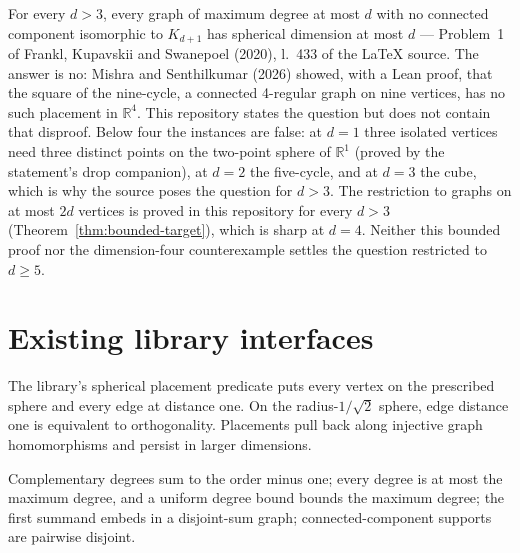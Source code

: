 \begin{conjecture}
  \label{que:fks}
  For every $d > 3$, every graph of maximum degree at most $d$ with no connected component
  isomorphic to $K_{d+1}$ has spherical dimension at most $d$ --- Problem~1 of
  Frankl, Kupavskii and Swanepoel (2020), l.~433 of the LaTeX source. The answer is no: Mishra and
  Senthilkumar (2026) showed, with a Lean proof, that the square of the nine-cycle, a
  connected 4-regular graph on nine vertices, has no such placement in $\mathbb{R}^4$. This
  repository states the question but does not contain that disproof. Below four the instances are false: at $d = 1$ three
  isolated vertices need three distinct points on the two-point sphere of $\mathbb{R}^1$
  (proved by the statement's drop companion), at $d = 2$ the five-cycle, and at $d = 3$ the
  cube, which is why the source poses the question for $d > 3$. The restriction to graphs
  on at most $2 d$ vertices is proved in this repository for every $d > 3$
  (Theorem~\ref{thm:bounded-target}), which is sharp at $d = 4$. Neither this bounded proof
  nor the dimension-four counterexample settles the question restricted to $d \ge 5$.
\end{conjecture}

\section{Existing library interfaces}

\begin{definition}
  \label{lib:sphere}
  \leanok
  The library's spherical placement predicate puts every vertex on the prescribed sphere
  and every edge at distance one. On the radius-$1/\sqrt2$ sphere, edge distance one is
  equivalent to orthogonality. Placements pull back along injective graph homomorphisms
  and persist in larger dimensions.
\end{definition}

\begin{lemma}
  \label{lib:graphs}
  \leanok
  Complementary degrees sum to the order minus one; every degree is at most the maximum
  degree, and a uniform degree bound bounds the maximum degree; the first summand embeds in
  a disjoint-sum graph; connected-component supports are pairwise disjoint.
\end{lemma}

